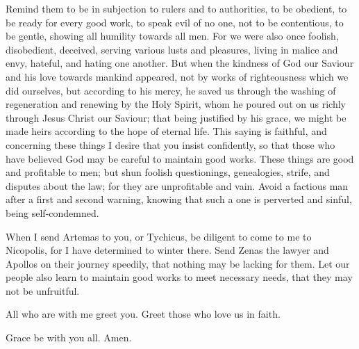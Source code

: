  Remind them to be in subjection to rulers and to
authorities, to be obedient, to be ready for every good work,
 to speak evil of no one, not to be contentious, to be
gentle, showing all humility towards all men.  For we were
also once foolish, disobedient, deceived, serving various lusts and
pleasures, living in malice and envy, hateful, and hating one another.
 But when the kindness of God our Saviour and his love
towards mankind appeared,  not by works of righteousness
which we did ourselves, but according to his mercy, he saved us through
the washing of regeneration and renewing by the Holy Spirit,
 whom he poured out on us richly through Jesus Christ our
Saviour;  that being justified by his grace, we might be
made heirs according to the hope of eternal life.  This
saying is faithful, and concerning these things I desire that you insist
confidently, so that those who have believed God may be careful to
maintain good works. These things are good and profitable to men;
 but shun foolish questionings, genealogies, strife, and
disputes about the law; for they are unprofitable and vain.
 Avoid a factious man after a first and second warning,
 knowing that such a one is perverted and sinful, being
self-condemned.

 When I send Artemas to you, or Tychicus, be diligent to
come to me to Nicopolis, for I have determined to winter there.
 Send Zenas the lawyer and Apollos on their journey
speedily, that nothing may be lacking for them.  Let our
people also learn to maintain good works to meet necessary needs, that
they may not be unfruitful.

 All who are with me greet you. Greet those who love us
in faith.

Grace be with you all. Amen.
